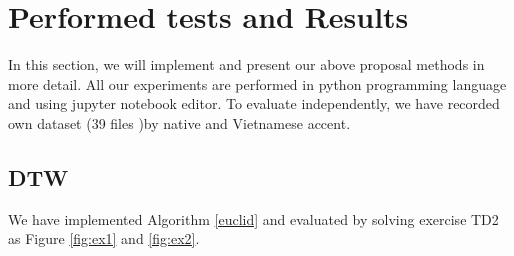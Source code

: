 \documentclass[%
  article,%
  10pt,%
  a4paper,%
  fleqn,%
  oneside,%
  sumario = tradicional,%
  chapter = TITLE,%
  section = TITLE,%
]{abntex2}
\begin{document}
\section{Performed tests and Results}\label{sec:res}
In this section, we will implement and present our above proposal methods in more detail. All our experiments are performed in python programming language and using jupyter notebook editor. To evaluate independently, we have recorded own dataset (39 files )by native and Vietnamese accent.

\subsection{DTW}
We have implemented Algorithm \ref{euclid} and evaluated by solving exercise TD2 as Figure \ref{fig:ex1} and \ref{fig:ex2}.
\end{document}
